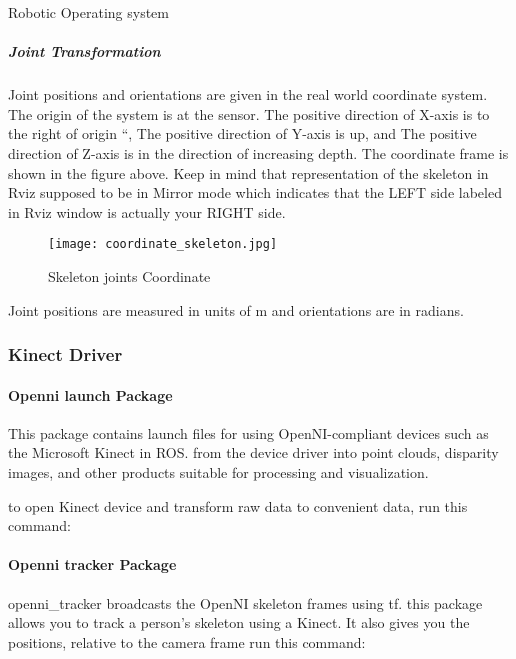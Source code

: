 \documentclass[a4paper]{book}
\begin{document}
\begin{chapter}{Robotic Operating system}

\subparagraph{Joint Transformation}
Joint positions and orientations are given in the real world coordinate system. The origin of the system is at the sensor. The positive direction of X-axis is to the right of origin “, The positive direction of Y-axis is up, and The positive direction of Z-axis is in the direction of increasing depth. The coordinate frame is shown in the figure above.
\newline
Keep in mind that representation of the skeleton in Rviz supposed to be in Mirror mode which indicates that the LEFT side labeled in Rviz window is actually your RIGHT side.
\begin{figure}[ht]
	\centering
	\caption{Skeleton joints Coordinate}
	\texttt{[image: coordinate\_skeleton.jpg]}
\end{figure}

Joint positions are measured in units of m and orientations are  in radians.
\subsubsection{Kinect Driver}
\paragraph{Openni launch Package} This package contains launch files for using OpenNI-compliant devices such as the Microsoft Kinect in ROS.  from the device driver into point clouds, disparity images, and other products suitable for processing and visualization.

to open Kinect device and transform raw data to convenient data, run this command:
\vspace{.5cm}
\newline


\paragraph{Openni tracker Package}
openni\_tracker broadcasts the OpenNI skeleton frames using tf.
this package allows you to track a person's skeleton using a Kinect. It also gives you the positions, relative to the camera frame
run this command:
\vspace{.5cm}
\newline


\end{chapter}
\end{document}
